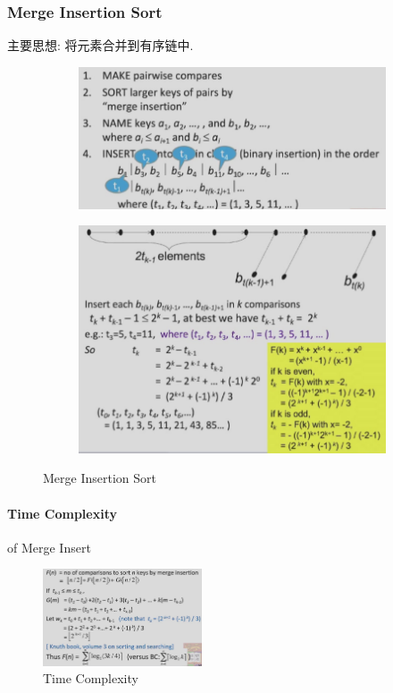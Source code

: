 \subsubsection{Merge Insertion Sort}
主要思想: 将元素合并到有序链中. 

\begin{figure}[!htb]
    \centering
    \begin{subfigure}{0.42\textwidth}
        \centering
        \includegraphics[width=\textwidth]{pic/DAA1/Merge Insertion Sort1}
    \end{subfigure}
    \begin{subfigure}{0.42\textwidth}
        \centering
        \includegraphics[width=\textwidth]{pic/DAA1/Merge Insertion Sort2}
    \end{subfigure}
    \caption{Merge Insertion Sort}
\end{figure}

\paragraph{Time Complexity} of Merge Insert
\begin{figure}[!htb]
    \centering
    \includegraphics[width=0.42\textwidth]{pic/DAA1/Time Complexity}
    \caption{Time Complexity}
\end{figure}

